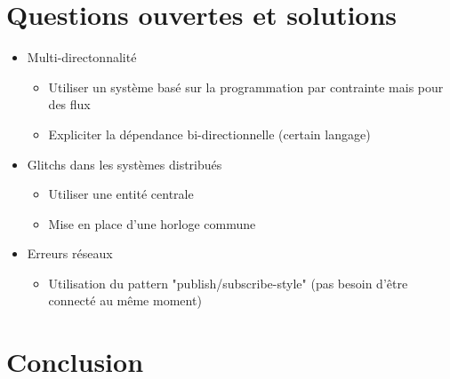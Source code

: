 \documentclass[10pt,final]{IEEEtran}
\begin{document}
\section{Questions ouvertes et solutions}

\begin{itemize}
    \item Multi-directonnalité
        \begin{itemize}
            \item Utiliser un système basé sur la programmation par contrainte mais pour des flux
            \item Expliciter la dépendance bi-directionnelle (certain langage)
        \end{itemize}
    \item Glitchs dans les systèmes distribués
        \begin{itemize}
            \item Utiliser une entité centrale
            \item Mise en place d'une horloge commune
        \end{itemize}
    \item Erreurs réseaux
        \begin{itemize}
            \item Utilisation du pattern "publish/subscribe-style" (pas besoin d'être connecté au
                même moment)
        \end{itemize}
\end{itemize}


\section{Conclusion}
\end{document}
